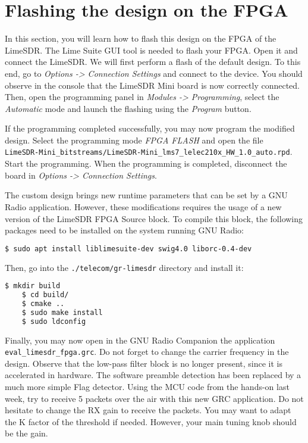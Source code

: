 


\section{Flashing the design on the FPGA}

 In this section, you will learn how to flash this design on the FPGA of the LimeSDR. The Lime Suite GUI tool is needed to flash your FPGA. Open it and connect the LimeSDR. We will first perform a flash of the default design. To this end, go to \textit{Options -> Connection Settings} and connect to the device. You should observe in the console that the LimeSDR Mini board is now correctly connected. Then, open the programming panel in \textit{Modules -> Programming}, select the \textit{Automatic} mode and launch the flashing using the \textit{Program} button.

If the programming completed successfully, you may now program the modified design. Select the programming mode \textit{FPGA FLASH} and open the file \\ \texttt{LimeSDR-Mini\_bitstreams/LimeSDR-Mini\_lms7\_lelec210x\_HW\_1.0\_auto.rpd}. Start the programming. When the programming is completed, disconnect the board in \textit{Options -> Connection Settings}.

The custom design brings new runtime parameters that can be set by a GNU Radio application. However, these modifications requires the usage of a new version of the LimeSDR FPGA Source block. To compile this block, the following packages need to be installed on the system running GNU Radio:
\begin{lstlisting}[language=bash]
    $ sudo apt install liblimesuite-dev swig4.0 liborc-0.4-dev
\end{lstlisting}
Then, go into the \texttt{./telecom/gr-limesdr} directory and install it:
\begin{lstlisting}[language=bash]
    $ mkdir build
    $ cd build/
    $ cmake ..
    $ sudo make install
    $ sudo ldconfig
\end{lstlisting}

Finally, you may now open in the GNU Radio Companion the application \texttt{eval\_limesdr\_fpga.grc}. Do not forget to change the carrier frequency in the design. Observe that the low-pass filter block is no longer present, since it is accelerated in hardware. The software preamble detection has been replaced by a much more simple Flag detector. Using the MCU code from the hands-on last week, try to receive 5 packets over the air with this new GRC application. Do not hesitate to change the RX gain to receive the packets. You may want to adapt the K factor of the threshold if needed. However, your main tuning knob should be the gain.
